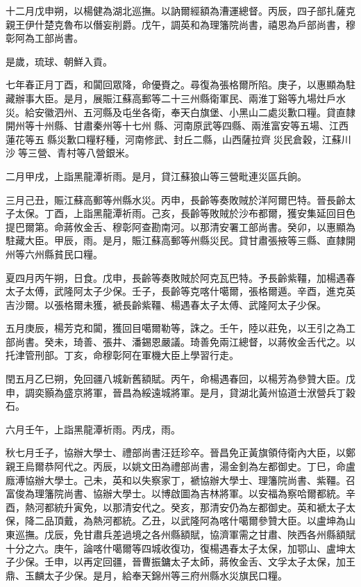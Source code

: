 \begin{pinyinscope}
十二月戊申朔，以楊健為湖北巡撫。以訥爾經額為漕運總督。丙辰，四子部扎薩克親王伊什楚克魯布以僭妄削爵。戊午，調英和為理籓院尚書，禧恩為戶部尚書，穆彰阿為工部尚書。

是歲，琉球、朝鮮入貢。

七年春正月丁酉，和闐回眾降，命優賚之。尋復為張格爾所陷。庚子，以惠顯為駐藏辦事大臣。是月，展賑江蘇高郵等二十三州縣衛軍民、兩淮丁谿等九場灶戶水災。給安徽泗州、五河縣及屯坐各衛，奉天白旗堡、小黑山二處災歉口糧。貸直隸開州等十州縣、甘肅秦州等十七州縣、河南原武等四縣、兩淮富安等五場、江西蓮花等五縣災歉口糧籽種，河南修武、封丘二縣，山西薩拉齊災民倉穀，江蘇川沙等三營、青村等八營銀米。

二月甲戌，上詣黑龍潭祈雨。是月，貸江蘇狼山等三營毗連災區兵餉。

三月己丑，賑江蘇高郵等州縣水災。丙申，長齡等奏敗賊於洋阿爾巴特。晉長齡太子太保。丁酉，上詣黑龍潭祈雨。己亥，長齡等敗賊於沙布都爾，獲安集延回目色提巴爾第。命蔣攸金舌、穆彰阿查勘南河。以那清安署工部尚書。癸卯，以惠顯為駐藏大臣。甲辰，雨。是月，賑江蘇高郵等州縣災民。貸甘肅張掖等三縣、直隸開州等六州縣貧民口糧。

夏四月丙午朔，日食。戊申，長齡等奏敗賊於阿克瓦巴特。予長齡紫韁，加楊遇春太子太傅，武隆阿太子少保。壬子，長齡等克喀什噶爾，張格爾遁。辛酉，進克英吉沙爾。以張格爾未獲，褫長齡紫韁、楊遇春太子太傅、武隆阿太子少保。

五月庚辰，楊芳克和闐，獲回目噶爾勒等，誅之。壬午，陸以莊免，以王引之為工部尚書。癸未，琦善、張井、潘錫恩嚴議。琦善免兩江總督，以蔣攸金舌代之。以托津管刑部。丁亥，命穆彰阿在軍機大臣上學習行走。

閏五月乙巳朔，免回疆八城新舊額賦。丙午，命楊遇春回，以楊芳為參贊大臣。戊申，調奕顥為盛京將軍，晉昌為綏遠城將軍。是月，貸湖北黃州協道士洑營兵丁穀石。

六月壬午，上詣黑龍潭祈雨。丙戌，雨。

秋七月壬子，協辦大學士、禮部尚書汪廷珍卒。晉昌免正黃旗領侍衛內大臣，以鄭親王烏爾恭阿代之。丙辰，以姚文田為禮部尚書，湯金釗為左都御史。丁巳，命盧廕溥協辦大學士。己未，英和以失察家丁，褫協辦大學士、理籓院尚書、紫韁。召富俊為理籓院尚書、協辦大學士。以博啟圖為吉林將軍。以安福為察哈爾都統。辛酉，熱河都統升寅免，以那清安代之。癸亥，那清安仍為左都御史。英和褫太子太保，降二品頂戴，為熱河都統。乙丑，以武隆阿為喀什噶爾參贊大臣。以盧坤為山東巡撫。戊辰，免甘肅兵差過境之各州縣額賦，協濟軍需之甘肅、陜西各州縣額賦十分之六。庚午，論喀什噶爾等四城收復功，復楊遇春太子太保，加鄂山、盧坤太子少保。壬申，以再定回疆，晉曹振鏞太子太師，蔣攸金舌、文孚太子太保，加王鼎、玉麟太子少保。是月，給奉天錦州等三府州縣水災旗民口糧。


\end{pinyinscope}
